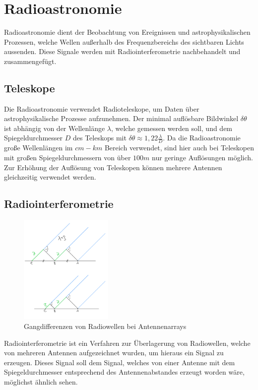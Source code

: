 \documentclass[]{dsadokumentation}
\begin{document}
\section{Radioastronomie}

Radioastronomie dient der Beobachtung von Ereignissen und astrophysikalischen Prozessen, welche Wellen außerhalb des Frequenzbereichs des sichtbaren Lichts aussenden. Diese Signale werden mit Radiointerferometrie nachbehandelt und zusammengefügt.

\subsection{Teleskope}

Die Radioastronomie verwendet Radioteleskope, um Daten über astrophysikalische Prozesse aufzunehmen.
Der minimal auflösbare Bildwinkel $\delta\theta$ ist abhängig von der Wellenlänge $\lambda$, welche gemessen werden soll, und dem Spiegeldurchmesser $D$ des Teleskops mit $\delta\theta\approx1,22\frac{\lambda}{D}$.
Da die Radioastronomie große Wellenlängen im $cm-km$ Bereich verwendet, sind hier auch bei Teleskopen mit großen Spiegeldurchmessern von über $100m$ nur geringe Auflösungen möglich. Zur Erhöhung der Auflösung von Teleskopen können mehrere Antennen gleichzeitig verwendet werden.

\subsection{Radiointerferometrie}
\begin{figure}[htb]
  \centering
  \includegraphics[width=0.4\textwidth]{k4.2/baselineunterschied.png}
  \caption{Gangdifferenzen von Radiowellen bei Antennenarrays}
  \label{k4.2.radioastro.interfero.bild.baselineunterschied}
\end{figure}

Radiointerferometrie ist ein Verfahren zur Überlagerung von Radiowellen, welche von mehreren Antennen aufgezeichnet wurden, um hieraus ein Signal zu erzeugen. Dieses Signal soll dem Signal, welches von einer Antenne mit dem Spiegeldurchmesser entsprechend des Antennenabstandes erzeugt worden wäre, möglichst ähnlich sehen.
\end{document}
